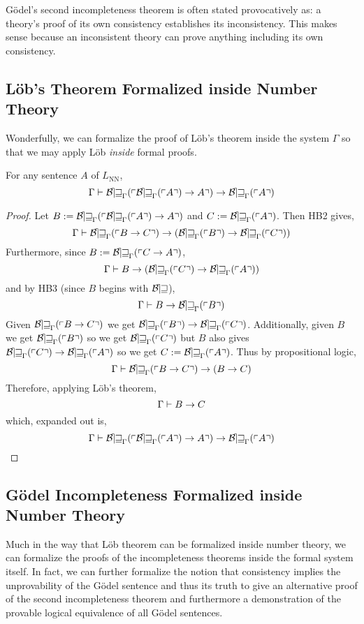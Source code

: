 \documentclass[12pt]{article}
\begin{document}
\begin{remark}
G\"{o}del's second incompleteness theorem is often stated provocatively as: a theory's proof of its own consistency establishes its inconsistency. This makes sense because an inconsistent theory can prove anything including its own consistency. 
\end{remark}

\subsection{L\"{o}b's Theorem Formalized inside Number Theory}

Wonderfully, we can formalize the proof of L\"{o}b's theorem inside the system $\Gamma$ so that we may apply L\"{o}b \textit{inside} formal proofs.


\begin{theorem}[L\"{o}b] 
For any sentence $A$ of $L_{\mathrm{NN}}$,
\[ \Gamma \proves \Thm{\Thm{A} \to A} \to \Thm{A} \]
\end{theorem}

\begin{proof}
Let $B := \Thm{\Thm{A} \to A}$ and $C := \Thm{A}$. Then HB2 gives,
\[ \Gamma \proves \Thm{B \to C} \to (\Thm{B} \to \Thm{C}) \]
Furthermore, since $B := \Thm{C \to A}$,
\[ \Gamma \proves B \to (\Thm{C} \to \Thm{A}) \]
and by HB3 (since $B$ begins with $\Bew$),
\[ \Gamma \proves B \to \Thm{B} \]
Given $\Thm{B \to C}$ we get $\Thm{B} \to \Thm{C}$. Additionally, given $B$ we get $\Thm{B}$ so we get $\Thm{C}$ but $B$ also gives $\Thm{C} \to \Thm{A}$ so we get $C := \Thm{A}$. Thus by propositional logic,
\[ \Gamma \proves \Thm{B \to C} \to (B \to C) \]
Therefore, applying L\"{o}b's theorem,
\[ \Gamma \proves B \to C \]
which, expanded out is,
\[ \Gamma \proves \Thm{\Thm{A} \to A} \to \Thm{A} \]
\end{proof}

\subsection{G\"{o}del Incompleteness Formalized inside Number Theory}

Much in the way that L\"{o}b theorem can be formalized inside number theory, we can formalize the proofs of the incompleteness theorems inside the formal system itself. In fact, we can further formalize the notion that consistency implies the unprovability of the G\"{o}del sentence and thus its truth to give an alternative proof of the second incompleteness theorem and furthermore a demonstration of the provable logical equivalence of all G\"{o}del sentences.  
\end{document}

